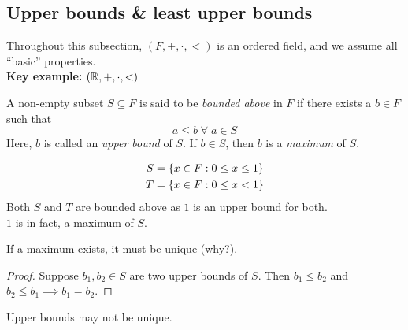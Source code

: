 \subsection{Upper bounds \& least upper bounds}
Throughout this subsection, $(F, +, \cdot, <)$ is an ordered field, and we assume all ``basic'' properties. \\
\textbf{Key example:} $(\mathbb{R}, +, \cdot, <)$

\begin{defn} \label{defn:bounds:upper}
    A non-empty subset $S \subseteq F$ is said to be \emph{bounded above} in $F$ if there exists a $b \in F$ such that \[
        a \leq b \;\forall\; a \in S
    \]
    Here, $b$ is called an \emph{upper bound} of $S$. If $b \in S$, then $b$ is a \emph{maximum} of $S$.
\end{defn}
\begin{example}
    \begin{align*}
        S &= \set{ x \in F : 0 \leq x \leq 1 } \\
        T &= \set{ x \in F : 0 \leq x < 1 }
    \end{align*}
    Both $S$ and $T$ are bounded above as $1$ is an upper bound for both. \\
    $1$ is in fact, a maximum of $S$.
\end{example}
\begin{rem}
    If a maximum exists, it must be unique (\textcolor{exercise}{why?}).
\end{rem}
\begin{proof}
    Suppose $b_{1}, b_{2} \in S$ are two upper bounds of $S$. Then $b_{1} \leq b_{2}$ and $b_{2} \leq b_{1} \implies b_{1} = b_{2}$.
\end{proof}
\begin{rem}
    Upper bounds may not be unique.
\end{rem}

